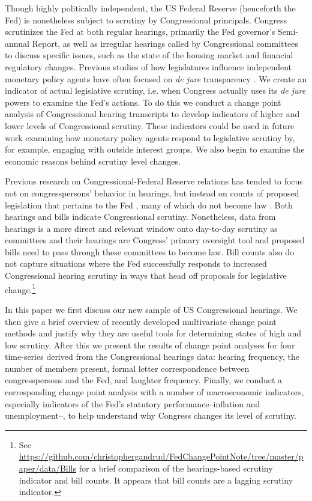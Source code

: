 \documentclass[a4paper]{article}\usepackage[]{graphicx}\usepackage[]{color}
\begin{document}
Though highly politically independent, the US Federal Reserve (henceforth the Fed) is nonetheless subject to scrutiny by Congressional principals. Congress scrutinizes the Fed at both regular hearings, primarily the Fed governor's Semi-annual Report, as well as irregular hearings called by Congressional committees to discuss specific issues, such as the state of the housing market and financial regulatory changes. Previous studies of how legislatures influence independent monetary policy agents have often focused on \emph{de jure} transparency \citep[for example][]{Stasavage2003}. We create an indicator of actual legislative scrutiny, i.e. when Congress actually uses its \emph{de jure} powers to examine the Fed's actions. To do this we conduct a change point analysis \citep{SenSrivastava1975, Killick2013, Matteson2014} of Congressional hearing transcripts to develop indicators of higher and lower levels of Congressional scrutiny. These indicators could be used in future work examining how monetary policy agents respond to legislative scrutiny by, for example, engaging with outside interest groups. We also begin to examine the economic reasons behind scrutiny level changes.

Previous research on Congressional-Federal Reserve relations has tended to focus not on congresspersons' behavior in hearings, but instead on counts of proposed legislation that pertains to the Fed \citep[e.g.][]{Kettl1988}, many of which do not become law \citep{Binder2014}. Both hearings and bills indicate Congressional scrutiny. Nonetheless, data from hearings is a more direct and relevant window onto day-to-day scrutiny as committees and their hearings are Congress' primary oversight tool \citep[][382]{oleszek2013} and proposed bills need to pass through these committees to become law. Bill counts also do not capture situations where the Fed successfully responds to increased Congressional hearing scrutiny in ways that head off proposals for legislative change.\footnote{See \url{https://github.com/christophergandrud/FedChangePointNote/tree/master/paper/data/Bills} for a brief comparison of the hearings-based scrutiny indicator and bill counts. It appears that bill counts are a lagging scrutiny indicator.}

In this paper we first discuss our new sample of US Congressional hearings. We then give a brief overview of recently developed multivariate change point methods and justify why they are useful tools for determining states of high and low scrutiny. After this we present the results of change point analyses for four time-series derived from the Congressional hearings data: hearing frequency, the number of members present, formal letter correspondence between congresspersons and the Fed, and laughter frequency. Finally, we conduct a corresponding change point analysis with a number of macroeconomic indicators, especially indicators of the Fed's statutory performance--inflation and unemployment--, to help understand why Congress changes its level of scrutiny.
\end{document}
